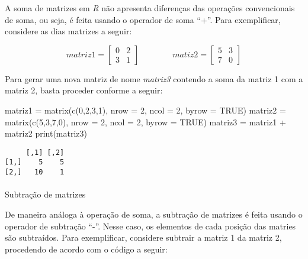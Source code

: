 \documentclass[
  letterpaper,
  DIV=11,
  numbers=noendperiod]{scrreprt}
\makeatletter
\let\oldparagraph\paragraph
\renewcommand{\paragraph}{
    \@ifstar
      \xxxParagraphStar
      \xxxParagraphNoStar
  }
\newcommand{\xxxParagraphStar}[1]{\oldparagraph*{#1}\mbox{}}
\newcommand{\xxxParagraphNoStar}[1]{\oldparagraph{#1}\mbox{}}
\newenvironment{Shaded}{\begin{snugshade}}{\end{snugshade}}
\newcommand{\AttributeTok}[1]{\textcolor[rgb]{0.40,0.45,0.13}{#1}}
\newcommand{\ConstantTok}[1]{\textcolor[rgb]{0.56,0.35,0.01}{#1}}
\newcommand{\DecValTok}[1]{\textcolor[rgb]{0.68,0.00,0.00}{#1}}
\newcommand{\FunctionTok}[1]{\textcolor[rgb]{0.28,0.35,0.67}{#1}}
\newcommand{\NormalTok}[1]{\textcolor[rgb]{0.00,0.23,0.31}{#1}}
\newcommand{\OtherTok}[1]{\textcolor[rgb]{0.00,0.23,0.31}{#1}}
\newcommand{\SpecialCharTok}[1]{\textcolor[rgb]{0.37,0.37,0.37}{#1}}
\makeatother
\begin{document}
A soma de matrizes em \emph{R} não apresenta diferenças das operações
convencionais de soma, ou seja, é feita usando o operador de soma ``+''.
Para exemplificar, considere as dias matrizes a seguir:

\[ matriz1 = \left[ \begin{array}{cc} 0 & 2 \\ 3 & 1 \end{array} \right] \quad \quad \quad \quad matiz2 = \left[ \begin{array}{cc} 5 & 3\\7 & 0 \end{array} \right] \]

Para gerar uma nova matriz de nome \emph{matriz3} contendo a soma da
matriz 1 com a matriz 2, basta proceder conforme a seguir:

\begin{Shaded}
\begin{Highlighting}[]
\NormalTok{matriz1 }\OtherTok{=} \FunctionTok{matrix}\NormalTok{(}\FunctionTok{c}\NormalTok{(}\DecValTok{0}\NormalTok{,}\DecValTok{2}\NormalTok{,}\DecValTok{3}\NormalTok{,}\DecValTok{1}\NormalTok{), }\AttributeTok{nrow =} \DecValTok{2}\NormalTok{, }\AttributeTok{ncol =} \DecValTok{2}\NormalTok{, }\AttributeTok{byrow =} \ConstantTok{TRUE}\NormalTok{)}
\NormalTok{matriz2 }\OtherTok{=} \FunctionTok{matrix}\NormalTok{(}\FunctionTok{c}\NormalTok{(}\DecValTok{5}\NormalTok{,}\DecValTok{3}\NormalTok{,}\DecValTok{7}\NormalTok{,}\DecValTok{0}\NormalTok{), }\AttributeTok{nrow =} \DecValTok{2}\NormalTok{, }\AttributeTok{ncol =} \DecValTok{2}\NormalTok{, }\AttributeTok{byrow =} \ConstantTok{TRUE}\NormalTok{)}
\NormalTok{matriz3 }\OtherTok{=}\NormalTok{ matriz1 }\SpecialCharTok{+}\NormalTok{ matriz2}
\FunctionTok{print}\NormalTok{(matriz3)}
\end{Highlighting}
\end{Shaded}

\begin{verbatim}
     [,1] [,2]
[1,]    5    5
[2,]   10    1
\end{verbatim}

\paragraph{Subtração de matrizes}\label{subtrauxe7uxe3o-de-matrizes}

De maneira análoga à operação de soma, a subtração de matrizes é feita
usando o operador de subtração ``-''. Nesse caso, os elementos de cada
posição das matries são subtraídos. Para exemplificar, considere
subtrair a matriz 1 da matriz 2, procedendo de acordo com o código a
seguir:
\end{document}

